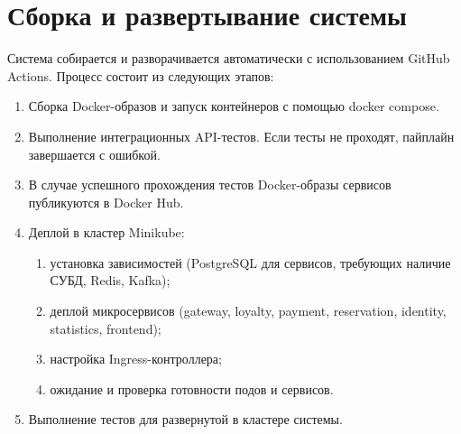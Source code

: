 \section{Сборка и развертывание системы}

Система собирается и разворачивается автоматически с использованием GitHub Actions. 
Процесс состоит из следующих этапов:
\begin{enumerate}
	\item Сборка Docker-образов и запуск контейнеров с помощью docker compose. 
	\item Выполнение интеграционных API-тестов. Если тесты не проходят, пайплайн завершается с ошибкой.
	\item В случае успешного прохождения тестов Docker-образы сервисов публикуются в Docker Hub. 
	\item Деплой в кластер Minikube:
	\begin{enumerate}
		\item установка зависимостей (PostgreSQL для сервисов, требующих наличие СУБД, Redis, Kafka);
		\item деплой микросервисов (gateway, loyalty, payment, reservation, identity, statistics, frontend);
		\item настройка Ingress-контроллера;
		\item ожидание и проверка готовности подов и сервисов.
	\end{enumerate}
	\item Выполнение тестов для развернутой в кластере системы.
\end{enumerate}

